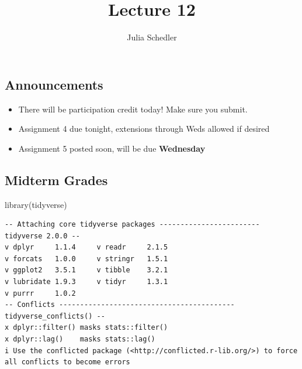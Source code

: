 \documentclass[
  letterpaper,
  DIV=11,
  numbers=noendperiod]{scrartcl}
\title{Lecture 12}
\author{Julia Schedler}
\date{}
\newenvironment{Shaded}{\begin{snugshade}}{\end{snugshade}}
\newcommand{\FunctionTok}[1]{\textcolor[rgb]{0.28,0.35,0.67}{#1}}
\newcommand{\NormalTok}[1]{\textcolor[rgb]{0.00,0.23,0.31}{#1}}
\begin{document}
\maketitle


\subsection{Announcements}\label{announcements}

\begin{itemize}
\item
  There will be participation credit today! Make sure you submit.
\item
  Assignment 4 due tonight, extensions through Weds allowed if desired
\item
  Assignment 5 posted soon, will be due \textbf{Wednesday}
\end{itemize}

\subsection{Midterm Grades}\label{midterm-grades}

\begin{Shaded}
\begin{Highlighting}[]
\FunctionTok{library}\NormalTok{(tidyverse)}
\end{Highlighting}
\end{Shaded}

\begin{verbatim}
-- Attaching core tidyverse packages ------------------------ tidyverse 2.0.0 --
v dplyr     1.1.4     v readr     2.1.5
v forcats   1.0.0     v stringr   1.5.1
v ggplot2   3.5.1     v tibble    3.2.1
v lubridate 1.9.3     v tidyr     1.3.1
v purrr     1.0.2     
-- Conflicts ------------------------------------------ tidyverse_conflicts() --
x dplyr::filter() masks stats::filter()
x dplyr::lag()    masks stats::lag()
i Use the conflicted package (<http://conflicted.r-lib.org/>) to force all conflicts to become errors
\end{verbatim}
\end{document}
